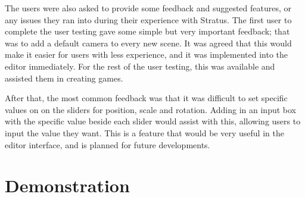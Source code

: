 	The users were also asked to provide some feedback and suggested features, or any issues they ran into during their experience with Stratus. The first user to complete the user testing gave some simple but very important feedback; that was to add a default camera to every new scene. It was agreed that this would make it easier for users with less experience, and it was implemented into the editor immediately. For the rest of the user testing, this was available and assisted them in creating games.

	After that, the most common feedback was that it was difficult to set specific values on on the sliders for position, scale and rotation. Adding in an input box with the specific value beside each slider would assist with this, allowing users to input the value they want. This is a feature that would be very useful in the editor interface, and is planned for future developments.

\section{Demonstration}
